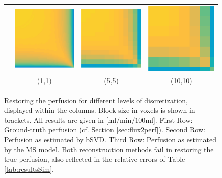 \documentclass[paper=a4, fontsize=11pt,parskip=half,headings=small]{scrartcl}
\newcommand{\siPml}{\milli\litre\per\minute\per100\milli\litre}
\begin{document}
\begin{figure}[H]
\begin{tabular}{c c c c}
			 \rbox{8ex}{MS} & \includegraphics[width = .25\textwidth]{./figs/recMS-PDE-1.eps} & \includegraphics[width = .25\textwidth]{./figs/recMS-PDE-5.eps} & \includegraphics[width = .25\textwidth]{./figs/recMS-PDE-10.eps}\\			 			 			  
			   & (1,1) & (5,5) & (10,10)
		\end{tabular}
		\caption{Restoring the perfusion for different levels of discretization, displayed within the columns. Block size in voxels is shown in brackets. All results are given in [$\si{\siPml}$]. First Row: Ground-truth perfusion (cf. Section \ref{sec:flux2perf}). Second Row: Perfusion as estimated by bSVD. Third Row: Perfusion as estimated by the MS model. Both reconstruction methods fail in restoring the true perfusion, also reflected in the relative errors of Table \ref{tab:resultsSim}.}	
		\label{fig:resultsPMM}			
	\end{figure}
\end{document}
